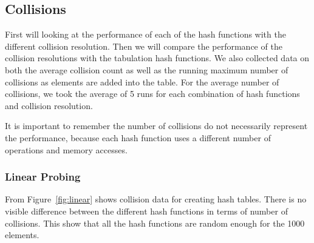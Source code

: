 \documentclass[11pt]{article}
\begin{document}
\subsection{Collisions}
First will looking at the performance of each of the hash functions with the 
different collision resolution. Then we will compare the performance of the
collision resolutions with the tabulation hash functions. We also collected data on 
both the average collision count  as well as the running maximum 
number of collisions as elements are added into the table. For the average number of collisions,
we took the average of 5 runs for each combination of hash functions and collision resolution.

It is important to remember the number of collisions do not necessarily 
represent the performance, because each hash function uses a different 
number of operations and memory accesses.

\subsubsection{Linear Probing}
From Figure~\ref{fig:linear} shows collision data for creating hash tables. 
There is no visible difference between the different hash functions in
terms of number of collisions. This show that all the hash functions are 
random enough for the 1000 elements. 
\end{document}
